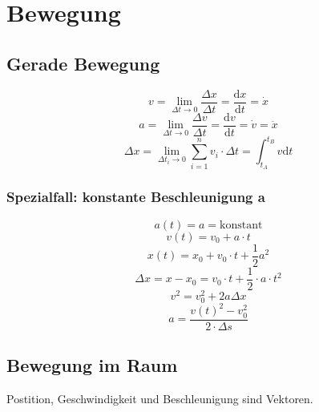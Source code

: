 



\chapter{Bewegung}

\section{Gerade Bewegung}

\[v=\lim\limits_{\Delta t \to 0}{\frac{\Delta x}{\Delta t}}=\frac{\mathrm{d}x}{\mathrm{d}t}=\dot{x}\]
\[a=\lim\limits_{\Delta t \to 0}{\frac{\Delta v}{\Delta t}}=\frac{\mathrm{d}v}{\mathrm{d}t}=\dot{v}=\ddot{x}\]
\[\Delta x=\lim\limits_{\Delta t_i \to 0}{\sum^{n}_{i=1}v_i\cdot\Delta t}=\int_{t_A}^{t_B}v\mathrm{d}t\]

\subsection{Spezialfall: konstante Beschleunigung a}

\[a(t)=a=\mathrm{konstant}\]
\[v(t)=v_0+a\cdot t\]
\[x(t)=x_0+v_0\cdot t+\frac{1}{2}a^{2}\]
\[\Delta x=x-x_0=v_0\cdot t+\frac{1}{2}\cdot a\cdot t^2\]
\[v^2=v_{0}^{2}+2a\Delta x\]
\[a=\frac{v(t)^2-v_0^2}{2\cdot\Delta s}\]

\section{Bewegung im Raum}
Postition, Geschwindigkeit und Beschleunigung sind Vektoren.\\


